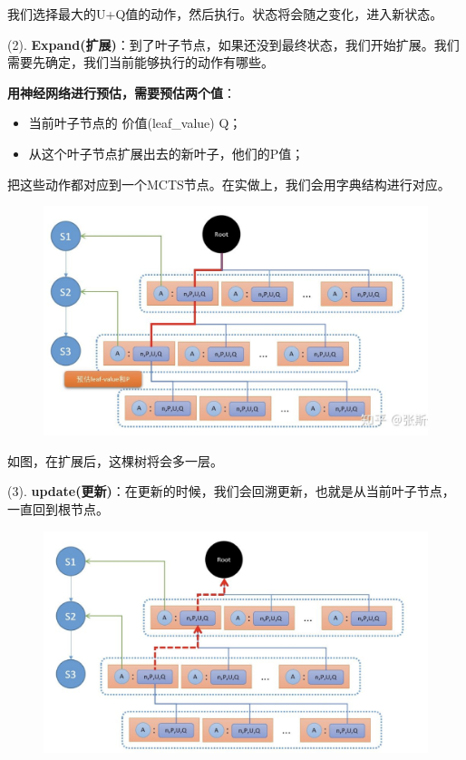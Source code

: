 \documentclass[12pt]{article}
\begin{document}
我们选择最大的U+Q值的动作，然后执行。状态将会随之变化，进入新状态。

(2). \textbf{Expand(扩展)}：到了叶子节点，如果还没到最终状态，我们开始扩展。我们需要先确定，我们当前能够执行的动作有哪些。

\textbf{用神经网络进行预估，需要预估两个值}：
\begin{itemize}
\setlength{\itemsep}{0pt}
\setlength{\parsep}{0pt}
\setlength{\parskip}{0pt}
    \item 当前叶子节点的 价值(leaf\_value) Q；
    \item 从这个叶子节点扩展出去的新叶子，他们的P值；
\end{itemize}

把这些动作都对应到一个MCTS节点。在实做上，我们会用字典结构进行对应。
\begin{figure}[H]
    \centering
    \includegraphics[width=.8\textwidth]{fig/ReinforcementLearning/AlphaZero_MCTS_3.png}
\end{figure}

如图，在扩展后，这棵树将会多一层。

(3). \textbf{update(更新)}：在更新的时候，我们会回溯更新，也就是从当前叶子节点，一直回到根节点。
\begin{figure}[H]
    \centering
    \includegraphics[width=.8\textwidth]{fig/ReinforcementLearning/AlphaZero_MCTS_4.png}
\end{figure}
\end{document}
